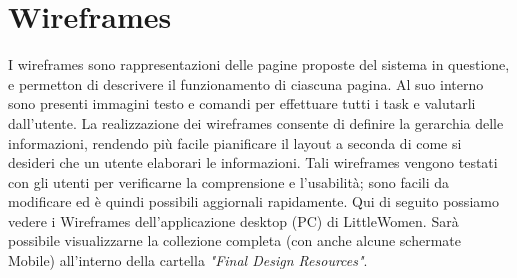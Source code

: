 \documentclass[12pt,a4paper]{report}
\begin{document}
\section{Wireframes}
I wireframes sono rappresentazioni delle pagine proposte del sistema in questione, e permetton di descrivere il funzionamento di ciascuna pagina. Al suo interno sono presenti immagini testo e comandi per effettuare tutti i task e valutarli dall'utente. La realizzazione dei wireframes consente di definire la gerarchia delle informazioni, rendendo più facile pianificare il layout a seconda di come si desideri che un utente elaborari le informazioni. Tali wireframes vengono testati con gli utenti per verificarne la comprensione e l'usabilità; sono facili da modificare ed è quindi possibili aggiornali rapidamente. Qui di seguito possiamo vedere i Wireframes dell'applicazione desktop (PC) di LittleWomen. Sarà possibile visualizzarne la collezione completa (con anche alcune schermate Mobile) all'interno della cartella \textit{"Final Design Resources"}.\\
\end{document}
